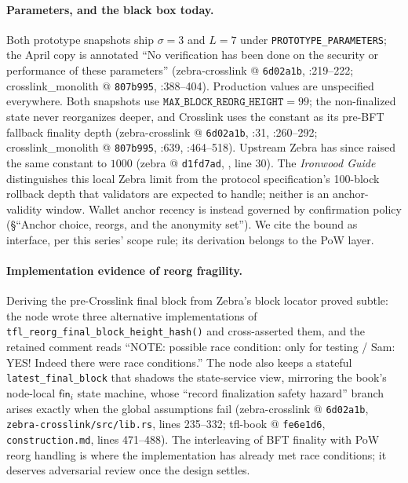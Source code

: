 \documentclass[11pt,a4paper]{article}
\theoremstyle{definition}
\begin{document}
\paragraph{Parameters, and the black box today.} Both prototype snapshots
ship $\sigma = 3$ and $L = 7$ under
\texttt{PROTOTYPE\_PARAMETERS}; the April copy is annotated ``No
verification has been done on the security or performance of these
parameters'' (zebra-crosslink @ \texttt{6d02a1b},
:219--222; crosslink\_monolith @
\texttt{807b995},
:388--404).
Production values are unspecified everywhere. Both snapshots use
$\texttt{MAX\_BLOCK\_REORG\_HEIGHT} = 99$; the non-finalized state never
reorganizes deeper, and Crosslink uses the constant as its pre-BFT fallback
finality depth (zebra-crosslink @ \texttt{6d02a1b},
:31,
:260--292; crosslink\_monolith @
\texttt{807b995},
:639,
:464--518). Upstream Zebra has
since raised the same constant to $1000$ (zebra @ \texttt{d1fd7ad},
, line 30). The
\emph{Ironwood Guide} distinguishes this local Zebra limit from the
protocol specification's 100-block rollback depth that validators are
expected to handle; neither is an anchor-validity window. Wallet anchor
recency is instead governed by confirmation policy
(\S``Anchor choice, reorgs, and the anonymity set'').
We cite the bound as interface, per this series' scope rule; its
derivation belongs to the PoW layer.

\paragraph{Implementation evidence of reorg fragility.} Deriving the
pre-Crosslink final block from Zebra's block locator proved subtle: the
node wrote three alternative implementations of
\texttt{tfl\_reorg\_final\_}\allowbreak\texttt{block\_height\_hash()} and
cross-asserted them, and the retained comment reads ``NOTE: possible race
condition: only for testing / Sam: YES! Indeed there were race
conditions.'' The node also keeps a stateful
\texttt{latest\_final\_block} that shadows the state-service view,
mirroring the book's node-local $\mathsf{fin}_i$ state machine, whose
``record finalization safety hazard'' branch arises exactly when the
global assumptions fail (zebra-crosslink @ \texttt{6d02a1b},
\texttt{zebra-crosslink/src/lib.rs}, lines 235--332; tfl-book @
\texttt{fe6e1d6}, \texttt{construction.md}, lines 471--488). The
interleaving of BFT finality with PoW reorg handling is where the
implementation has already met race conditions; it deserves adversarial
review once the design settles.
\end{document}

